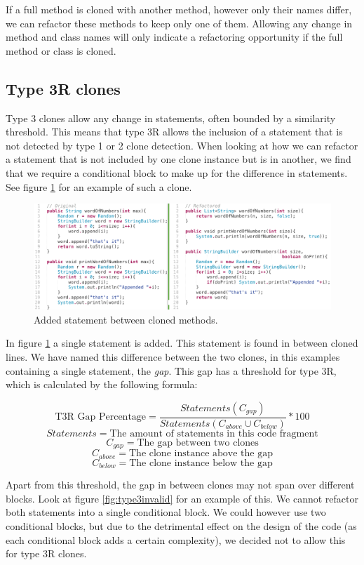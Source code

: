 If a full method is cloned with another method, however only their names differ, we can refactor these methods to keep only one of them. Allowing any change in method and class names will only indicate a refactoring opportunity if the full method or class is cloned.

\subsection{Type 3R clones}
Type 3 clones allow any change in statements, often bounded by a similarity threshold. This means that type 3R allows the inclusion of a statement that is not detected by type 1 or 2 clone detection. When looking at how we can refactor a statement that is not included by one clone instance but is in another, we find that we require a conditional block to make up for the difference in statements. See figure \ref{fig:type3} for an example of such a clone.

\begin{figure}[H]
  \centering
  \includegraphics[width=1\columnwidth]{img/type3_3}
  \caption{Added statement between cloned methods.}
  \label{fig:type3}
\end{figure}

In figure \ref{fig:type3} a single statement is added. This statement is found in between cloned lines. We have named this difference between the two clones, in this examples containing a single statement, the \textit{gap}. This gap has a threshold for type 3R, which is calculated by the following formula:

$$\text{T3R Gap Percentage}=\frac{Statements(C_{gap})}{Statements(C_{above} \cup C_{below})}*100$$
$$Statements = \text{The amount of statements in this code fragment}$$
$$C_{gap} = \text{The gap between two clones}$$
$$C_{above} = \text{The clone instance above the gap}$$
$$C_{below} = \text{The clone instance below the gap}$$

Apart from this threshold, the gap in between clones may not span over different blocks. Look at figure \ref{fig:type3invalid} for an example of this. We cannot refactor both statements into a single conditional block. We could however use two conditional blocks, but due to the detrimental effect on the design of the code (as each conditional block adds a certain complexity), we decided not to allow this for type 3R clones.


